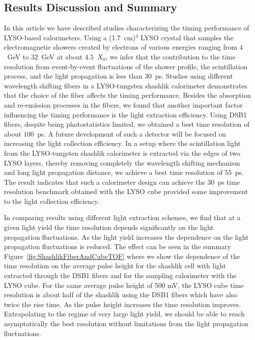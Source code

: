 \subsection{Results Discussion and Summary }
In this article we have described studies characterizing the timing performance
of LYSO-based calorimeters. Using a (1.7~cm)$^{3}$ LYSO crystal that
samples the electromagnetic showers created by electrons of various energies
ranging from $4$~GeV to $32$~GeV at about $4.5$~$X_{0}$, we infer that the
contribution to the time resolution from event-by-event fluctuations of the
shower profile, the scintillation process, and the light propagation is less than
$30$~ps. Studies using different wavelength shifting fibers in a LYSO-tungsten shashlik calorimeter 
demonstrates that the choice of the fiber affects the timing performance. Besides the absorption 
and re-emission processes in the fibers, we found that another important factor influencing
the timing performance is the light extraction efficiency. Using DSB1 fibers, despite being 
photostatistics limited, we obtained a best time resolution of about $100$~ps.  A future 
development of such a detector will  be focused on increasing the light collection efficiency.
In a setup where  the scintillation light from the LYSO-tungsten
shashlik calorimeter is extracted via the edges of two LYSO layers, thereby
removing completely the wavelength shifting mechanism and long light propagation distance, 
we achieve a best time resolution of $55$~ps. The result  indicates  that such a
calorimeter design can achieve the $30$~ps time resolution benchmark obtained with the LYSO cube
provided some improvement to the light collection efficiency. 

In comparing results using different light extraction schemes, we find that at a
given light yield the time resolution depends significantly on the light
propagation fluctuations. As the light yield increases the dependence on the
light propagation fluctuations is reduced. The effect can be seen in the summary
Figure~\ref{fig:ShashlikFiberAndCubeTOF} where we show the dependence of the
time resolution on the average pulse height for the shashlik cell with light
extracted through the DSB1 fibers and for the sampling calorimeter with the LYSO
cube. For the same average pulse height of 500 mV, the LYSO cube time resolution
is about half of the shashlik using the DSB1 fibers which have also twice the
rise time. As the pulse height increases the time resolution improves.
Extrapolating to the regime of very large light yield, we should be able to
reach asymptotically the best resolution without limitations from the light
propagation fluctuations. 


